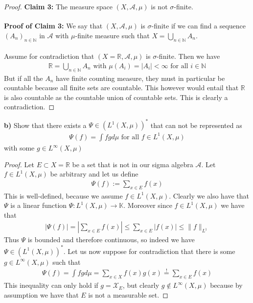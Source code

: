 \documentclass[12pt,a4paper]{article}
\begin{document}
\begin{proof}
\textbf{Claim 3:} The measure space $(X, \mathcal{A}, \mu)$ is not $\sigma$-finite. 
\\\\
\textbf{Proof of Claim 3:} We say that $(X, \mathcal{A},  \mu)$ is $\sigma$-finite if we can find a sequence $(A_n)_{n \in \mathbb{N}}$ in $\mathcal{A}$ with $\mu$-finite measure such that $X= \bigcup_{n \in \mathbb{N}} A_n$. 
\\\\
Assume for contradiction that $( X= \mathbb{R}, \mathcal{A}, \mu)$ is $\sigma$-finite. Then we have
\begin{align*}
\mathbb{R}= \bigcup_{n \in \mathbb{N}} A_n \text{ with } \mu(A_i)= |A_i| < \infty \text{ for all } i \in \mathbb{N}
\end{align*}
But if all the $A_n$ have finite counting measure, they must in particular be countable because all finite sets are countable. This however would entail that $\mathbb{R}$ is also countable as the countable union of countable sets. This is clearly a contradiction. 
\end{proof}
\newpage
\noindent \textbf{b)} Show that there exists a $\Psi \in (L^1(X, \mu))^*$ that can not be represented as \begin{align*}
\Psi(f) = \int fg d \mu \text{ for all } f \in L^1(X, \mu)
\end{align*}
with some $g \in L^\infty (X, \mu) $ 
\begin{proof}
Let $E \subset X= \mathbb{R}$ be a set that is not in our sigma algebra $\mathcal{A}$. Let $f \in L^1( X, \mu)$ be arbitrary and let us define
\begin{align*}
\Psi(f):= \sum_{x \in E} f(x) 
\end{align*}
This is well-defined, because we assume $f \in L^1(X, \mu)$. Clearly we also have that $\Psi$ is a linear function $\Psi: L^1(X, \mu) \to \mathbb{K}$. Moreover since $f \in L^1(X, \mu)$ we have that
\begin{align*}
|\Psi(f)| = \left | \sum_{x \in E} f(x) \right| \leq \sum_{x \in E} |f(x)|  \leq \|f\|_{L^1}
\end{align*}
Thus $\Psi$ is bounded and therefore continuous, so indeed we have $\Psi \in (L^1(X, \mu))^*$. Let us now suppose for contradiction that there is some $g \in L^\infty (X, \mu)$ such that \begin{align*}
\Psi(f) = \int fg d \mu = \sum_{x \in X} f(x)g(x) \overset{!}= \sum_{x \in E} f(x)
\end{align*}
This inequality can only hold if $g= \mathcal{X}_E$, but clearly $g \notin L^\infty(X, \mu)$ because by assumption we have that $E$ is not a measurable set. 
\end{proof}
\newpage
\end{document}
